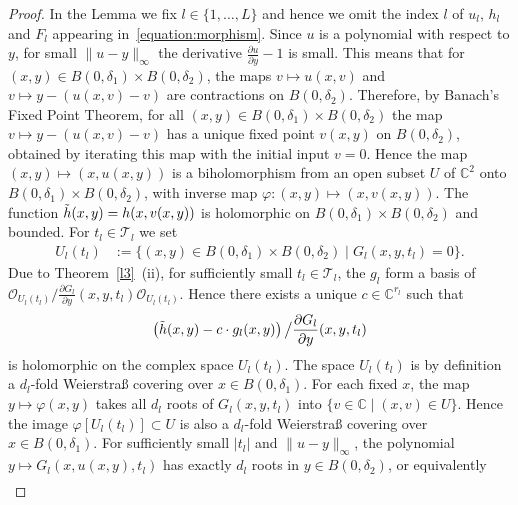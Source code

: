 \documentclass[11pt,twoside]{amsart}
\theoremstyle{plain}
\newcommand{\Sh}[1]{\mathcal{#1}} %
\begin{document}
\begin{proof}
In the Lemma we fix $l\in\{1,\ldots,L\}$ and hence we omit the index $l$ of $u_l,\, h_l$ and $F_l$ appearing in~\eqref{equation:morphism}.
Since $u$ is a polynomial with respect to $y$, for small $\|u-y\|_\infty$ the derivative $\frac{\partial u}{\partial y}-1$ is small. This means that for $(x,y)\in B(0,\delta_1)\times B(0,\delta_2)$, the maps $v\mapsto u(x,v)$ and $v\mapsto y-(u(x,v)-v)$ are contractions on $B(0,\delta_2)$. Therefore, by Banach's Fixed Point Theorem, for all $(x,y)\in B(0,\delta_1)\times B(0,\delta_2)$ the map $v\mapsto y-(u(x,v)-v)$ has a unique fixed point $v(x,y)$ on $ B(0,\delta_2)$, obtained by iterating this map with the initial input $v=0$. Hence the map $(x,y)\mapsto (x,u(x,y))$ is a biholomorphism from an open subset $U$ of $\mathbb{C}^2$ onto $B(0,\delta_1)\times B(0,\delta_2)$, with inverse map $\varphi: (x,y)\mapsto(x,v(x,y))$. The function $\Tilde{h}(x,y)=h(x,v(x,y))$ is holomorphic on $B(0,\delta_1)\times B(0,\delta_2)$ and bounded.
For $ t_l\in\mathcal T_l$ we set
\begin{align*}
U_l(t_l) &:= \big\{ (x,y) \in B(0,\delta_1)\times B(0,\delta_2) \mid G_l(x,y,t_l) = 0 \big\}.%
\end{align*}
Due to Theorem~\ref{l3}~(ii), for sufficiently small $ t_l\in\mathcal T_l$,  the $g_l$ form a basis of  $\Sh{O}_{U_l(t_l)}\big/\frac{\partial G_l}{\partial y}(x,y,t_l)\Sh{O}_{U_l(t_l)}$.
Hence there exists a unique $c\in\mathbb{C}^{{r_l}}$ such that
\begin{align}\label{eq:unique c}
\left(\Tilde{h}(x,y)-c\cdot g_l(x,y)\right)\big/\frac{\partial G_l}{\partial y}(x,y,t_l)
\end{align}
is holomorphic on the complex space $U_l(t_l)$. %
The space $U_l(t_l)$ is by definition a $ d_l $-fold Weierstra{\ss} covering over $x\in B(0,\delta_1)$. For each fixed $x$, the map $y\mapsto\varphi(x,y)$ takes all $d_l$ roots of $G_l(x,y,t_l)$ into $\{v\in\mathbb{C}\mid (x,v)\in U\}$. Hence the image $\varphi[U_l(t_l)] \subset U$ is also a $ d_l $-fold Weierstra{\ss} covering over $x\in B(0,\delta_1)$. For sufficiently small $|t_l|$ and $\|u-y\|_\infty$, the polynomial $y\mapsto G_l(x,u(x,y),t_l)$ has exactly $ d_l $ roots in $y\in B(0,\delta_2)$, or equivalently
\begin{align}\label{eq U subset ball}

\end{align}
\end{proof}
\end{document}
